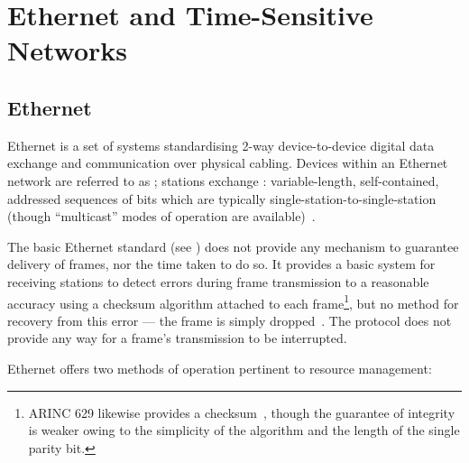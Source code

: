 \section{Ethernet and Time-Sensitive Networks}

\subsection{Ethernet}

%

Ethernet is a set of systems standardising 2-way device-to-device digital data exchange and communication over physical cabling.
Devices within an Ethernet network are referred to as ; stations exchange : variable-length, self-contained, addressed sequences of bits which are typically single-station-to-single-station (though ``multicast'' modes of operation are available)~\cite{IEEEStandardEthernet2022,spurgeonEthernetDefinitiveGuide2000}.

The basic Ethernet standard (see \cite{IEEEStandardEthernet2022}) does not provide any mechanism to guarantee delivery of frames, nor the time taken to do so.
It provides a basic system for receiving stations to detect errors during frame transmission to a reasonable accuracy using a checksum algorithm attached to each frame\footnote{ARINC 629 likewise provides a checksum~\cite{dheerajpuniaARINC629Digital2021}, though the guarantee of integrity is weaker owing to the simplicity of the algorithm and the length of the single parity bit.}, but no method for recovery from this error --- the frame is simply dropped~\cite{odomCCNA200301Official2019}.
The protocol does not provide any way for a frame's transmission to be interrupted.

Ethernet offers two methods of operation pertinent to resource management:

